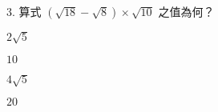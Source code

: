 \documentclass[12pt]{article}
\begin{document}
\begin{problem}
  \item[3.] 算式 $(\sqrt{18} - \sqrt{8}) \times \sqrt{10}$ 之值為何？
  \begin{choices}
    \item $2\sqrt{5}$
    \item $10$
    \item $4\sqrt{5}$
    \item $20$
  \end{choices}
\end{problem}
\end{document}
